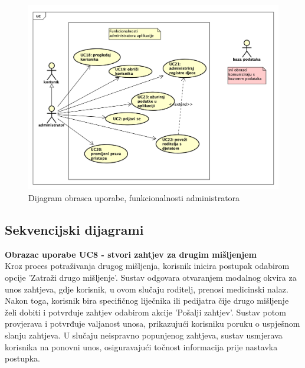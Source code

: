 					\begin{figure}[H]
						\includegraphics[width=\textwidth]{slike/uc_admin.png} 
						\caption{Dijagram obrasca uporabe, funkcionalnosti administratora}
						\label{fig:promjene2} 
					\end{figure}
				\eject		
				
			\subsection{Sekvencijski dijagrami}
				
				
				\noindent\textbf{Obrazac uporabe UC8 - stvori zahtjev za drugim mišljenjem}\\
				Kroz proces potraživanja drugog mišljenja, korisnik inicira postupak odabirom opcije 
				'Zatraži drugo mišljenje'. Sustav odgovara otvaranjem modalnog okvira za unos zahtjeva, 
				gdje korisnik, u ovom slučaju roditelj, prenosi medicinski nalaz. Nakon toga, korisnik 
				bira specifičnog liječnika ili pedijatra čije drugo mišljenje želi dobiti i potvrđuje 
				zahtjev odabirom akcije 'Pošalji zahtjev'. Sustav potom provjerava i potvrđuje valjanost 
				unosa, prikazujući korisniku poruku o uspješnom slanju zahtjeva. U slučaju neispravno 
				popunjenog zahtjeva, sustav usmjerava korisnika na ponovni unos, osiguravajući točnost 
				informacija prije nastavka postupka. \\

